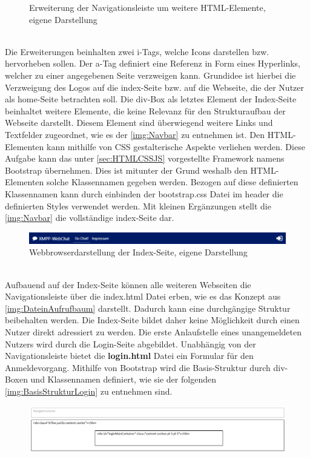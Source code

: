 \documentclass[a4paper,titlepage,halfparskip,12pt]{scrreprt}
\begin{document}
\begin{onehalfspacing}
\begin{figure}[h]
	\caption{Erweiterung der Navigationsleiste um weitere HTML-Elemente, eigene Darstellung}
	\label{img:index-strukturInhalt}
\end{figure}\\
Die Erweiterungen beinhalten zwei i-Tags, welche Icons darstellen bzw. hervorheben sollen. Der a-Tag definiert eine Referenz in Form eines Hyperlinks, welcher zu einer angegebenen Seite verzweigen kann. Grundidee ist hierbei die Verzweigung des Logos auf die index-Seite bzw. auf die Webseite, die der Nutzer als home-Seite betrachten soll. Die div-Box als letztes Element der Index-Seite beinhaltet weitere Elemente, die keine Relevanz für den Strukturaufbau der Webseite darstellt. Diesem Element sind überwiegend weitere Links und Textfelder zugeordnet, wie es der \autoref{img:Navbar} zu entnehmen ist. Den \ac{HTML}-Elementen kann mithilfe von \ac{CSS} gestalterische Aspekte verliehen werden. Diese Aufgabe kann das unter \autoref{sec:HTMLCSSJS} vorgestellte Framework namens Bootstrap übernehmen. Dies ist mitunter der Grund weshalb den \ac{HTML}-Elementen solche Klassennamen gegeben werden. Bezogen auf diese definierten Klassennamen kann durch einbinden der bootstrap.css Datei im header die definierten Styles verwendet werden. Mit kleinen Ergänzungen stellt die \autoref{img:Navbar} die vollständige index-Seite dar.
\begin{figure}[h]
	\centering
	\includegraphics[width=\linewidth]{images/indexHTML&CSS}
	\caption{Webbrowserdarstellung der Index-Seite, eigene Darstellung}
	\label{img:Navbar}
\end{figure}\\
Aufbauend auf der Index-Seite können alle weiteren Webseiten die Navigationsleiste über die index.html Datei erben, wie es das Konzept aus \autoref{img:DateinAufrufbaum} darstellt. Dadurch kann eine durchgängige Struktur beibehalten werden. Die Index-Seite bildet daher keine Möglichkeit durch einen Nutzer direkt adressiert zu werden. Die erste Anlaufstelle eines unangemeldeten Nutzers wird durch die Login-Seite abgebildet. Unabhängig von der Navigationsleiste bietet die \textbf{login.html} Datei ein Formular für den Anmeldevorgang. Mithilfe von Bootstrap wird die Basis-Struktur durch div-Boxen und Klassennamen definiert, wie sie der folgenden \autoref{img:BasisStrukturLogin} zu entnehmen sind.
\begin{figure}[h]
	\centering
	\includegraphics[width=\linewidth]{images/loginBasisStruktur}

\end{figure}
\end{onehalfspacing}
\end{document}
